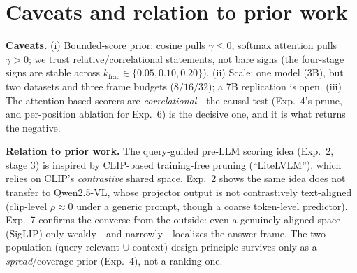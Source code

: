 \documentclass[11pt]{article}
\newcommand{\gm}{\gamma}
\begin{document}
\section{Caveats and relation to prior work}
\textbf{Caveats.} (i) Bounded-score prior: cosine pulls $\gm{\le}0$, softmax attention pulls
$\gm{>}0$; we trust relative/correlational statements, not bare signs (the four-stage signs are
stable across $k_{\mathrm{frac}}\in\{0.05,0.10,0.20\}$). (ii) Scale: one model (3B), but two datasets
and three frame budgets ($8/16/32$); a 7B replication is open. (iii) The attention-based scorers are
\emph{correlational}---the causal test (Exp.~4's prune, and per-position ablation for Exp.~6) is the
decisive one, and it is what returns the negative.

\smallskip
\noindent\textbf{Relation to prior work.} The query-guided pre-LLM scoring idea (Exp.~2, stage 3) is
inspired by CLIP-based training-free pruning (``LiteLVLM''), which relies on CLIP's \emph{contrastive}
shared space. Exp.~2 shows the same idea does not transfer to Qwen2.5-VL, whose projector output is
not contrastively text-aligned (clip-level $\rho{\approx}0$ under a generic prompt, though a coarse
token-level predictor). Exp.~7 confirms the converse from the outside: even a genuinely aligned space
(SigLIP) only weakly---and narrowly---localizes the answer frame. The two-population (query-relevant
$\cup$ context) design principle survives only as a \emph{spread}/coverage prior (Exp.~4), not a
ranking one.
\end{document}
